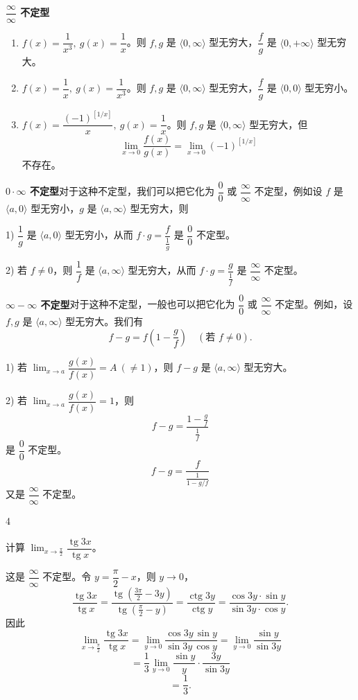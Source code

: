 \textbf{\(\dfrac\infty\infty\) 不定型}\quad
\begin{enumerate}[label=\arabic*)]
	\item \(f(x)=\dfrac1{x^3},\ g(x)=\dfrac1x\)。则 \(f,g\) 是 \(\langle0,\infty\rangle\) 型无穷大，\(\dfrac fg\) 是 \(\langle0,+\infty\rangle\) 型无穷大。
	\item \(f(x)=\dfrac1x,\ g(x)=\dfrac1{x^3}\)。则 \(f,g\) 是 \(\langle0,\infty\rangle\) 型无穷大，\(\dfrac fg\) 是 \(\langle0,0\rangle\) 型无穷小。
	\item \(f(x)=\dfrac{(-1)^{[1/x]}}x,\ g(x)=\dfrac1x\)。则 \(f,g\) 是 \(\langle0,\infty\rangle\) 型无穷大，但
	\[
	\lim_{x\to0}\frac{f(x)}{g(x)}=\lim_{x\to0}(-1)^{[1/x]}
	\]
	不存在。
\end{enumerate}

\textbf{\(0\cdot\infty\) 不定型}\quad 对于这种不定型，我们可以把它化为 \(\dfrac00\) 或 \(\dfrac\infty\infty\) 不定型，例如设 \(f\) 是 \(\langle a,0\rangle\) 型无穷小，\(g\) 是 \(\langle a,\infty\rangle\) 型无穷大，则

1) \(\dfrac1g\) 是 \(\langle a,0\rangle\) 型无穷小，从而 \(f\cdot g=\dfrac{f}{\frac1g}\) 是 \(\dfrac00\) 不定型。

2) 若 \(f\neq0\)，则 \(\dfrac1f\) 是 \(\langle a,\infty\rangle\) 型无穷大，从而 \(f\cdot g=\dfrac{g}{\frac1f}\) 是 \(\dfrac\infty\infty\) 不定型。

\textbf{\(\infty-\infty\) 不定型}\quad 对于这种不定型，一般也可以把它化为 \(\dfrac00\) 或 \(\dfrac\infty\infty\) 不定型。例如，设 \(f,g\) 是 \(\langle a,\infty\rangle\) 型无穷大。我们有
\[
f-g=f\left(1-\frac gf\right)\quad(\text{若 }f\neq0).
\]

1) 若 \(\lim_{x\to a}\dfrac{g(x)}{f(x)}=A\ (\neq1)\)，则 \(f-g\) 是 \(\langle a,\infty\rangle\) 型无穷大。

2) 若 \(\lim_{x\to a}\dfrac{g(x)}{f(x)}=1\)，则
\[
f-g=\frac{1-\frac gf}{\frac1f}
\]
是 \(\dfrac00\) 不定型。
\[
f-g=\frac{f}{\frac1{1-g/f}}
\]
又是 \(\dfrac\infty\infty\) 不定型。

\begin{sourceexample}{4}

	计算 \(\lim_{x\to\frac\pi2}\dfrac{\operatorname{tg}3x}{\operatorname{tg}x}\)。

	这是 \(\dfrac\infty\infty\) 不定型。令 \(y=\dfrac\pi2-x\)，则 \(y\to0\)，
	\[
	\frac{\operatorname{tg}3x}{\operatorname{tg}x}=\frac{\operatorname{tg}\left(\frac{3\pi}2-3y\right)}{\operatorname{tg}\left(\frac\pi2-y\right)}=\frac{\operatorname{ctg}3y}{\operatorname{ctg}y}=\frac{\cos3y\cdot\sin y}{\sin3y\cdot\cos y}.
	\]
	因此
	\[
	\lim_{x\to\frac\pi2}\frac{\operatorname{tg}3x}{\operatorname{tg}x}=\lim_{y\to0}\frac{\cos3y\,\sin y}{\sin3y\,\cos y}=\lim_{y\to0}\frac{\sin y}{\sin3y}
	\]
	\[
	=\frac13\lim_{y\to0}\frac{\sin y}{y}\cdot\frac{3y}{\sin3y}
	\]
	\[
	=\frac13.
	\]

\end{sourceexample}

